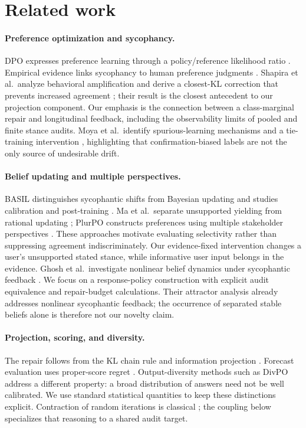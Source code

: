 \documentclass[10pt]{article}
\begin{document}
\section{Related work}
\paragraph{Preference optimization and sycophancy.}
DPO expresses preference learning through a policy/reference likelihood
ratio \citep{rafailov2023}. Empirical evidence links sycophancy to human
preference judgments \citep{sharma2024}. Shapira et al.\ analyze behavioral
amplification and derive a closest-KL correction that prevents increased
agreement \citep{shapira2026}; their result is the closest antecedent to our
projection component. Our emphasis is the connection between a class-marginal
repair and longitudinal feedback, including the observability limits of
pooled and finite stance audits. Moya et al.\ identify spurious-learning
mechanisms and a tie-training intervention \citep{moya2026}, highlighting
that confirmation-biased labels are not the only source of undesirable drift.

\paragraph{Belief updating and multiple perspectives.}
BASIL distinguishes sycophantic shifts from Bayesian updating and studies
calibration and post-training \citep{atwell2026}. Ma et al.\ separate
unsupported yielding from rational updating \citep{ma2026}; PlurPO constructs
preferences using multiple stakeholder perspectives \citep{hatgis2026}.
These approaches motivate evaluating selectivity rather than suppressing
agreement indiscriminately. Our evidence-fixed intervention changes a
user's unsupported stated stance, while informative user input belongs in
the evidence. Ghosh et al.\ investigate nonlinear belief dynamics under
sycophantic feedback \citep{ghosh2026}. We focus on a response-policy
construction with explicit audit equivalence and repair-budget calculations. Their attractor analysis already addresses nonlinear sycophantic feedback; the occurrence of separated stable beliefs alone is therefore not our novelty claim.

\paragraph{Projection, scoring, and diversity.}
The repair follows from the KL chain rule and information projection
\citep{csiszar1975}. Forecast evaluation uses proper-score regret
\citep{gneiting2007}. Output-diversity methods such as DivPO
\citep{lanchantin2025} address a different property: a broad distribution of
answers need not be well calibrated. We use standard statistical quantities
to keep these distinctions explicit. Contraction of random iterations is classical \citep{diaconis1999}; the coupling below specializes that reasoning to a shared audit target.
\end{document}
